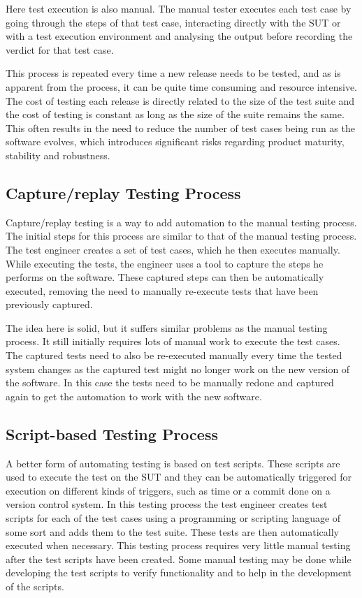 Here test execution is also manual. The manual tester executes each test case by going through the steps of that test case, interacting directly with the SUT or with a test execution environment and analysing the output before recording the verdict for that test case.

This process is repeated every time a new release needs to be tested, and as is apparent from the process, it can be quite time consuming and resource intensive. The cost of testing each release is directly related to the size of the test suite and the cost of testing is constant as long as the size of the suite remains the same. This often results in the need to reduce the number of test cases being run as the software evolves, which introduces significant risks regarding product maturity, stability and robustness.

\subsection{Capture/replay Testing Process}
Capture/replay testing is a way to add automation to the manual testing process. The initial steps for this process are similar to that of the manual testing process. The test engineer creates a set of test cases, which he then executes manually. While executing the tests, the engineer uses a tool to capture the steps he performs on the software. These captured steps can then be automatically executed, removing the need to manually re-execute tests that have been previously captured.

The idea here is solid, but it suffers similar problems as the manual testing process. It still initially requires lots of manual work to execute the test cases. The captured tests need to also be re-executed manually every time the tested system changes as the captured test might no longer work on the new version of the software. In this case the tests need to be manually redone and captured again to get the automation to work with the new software.

\subsection{Script-based Testing Process}
A better form of automating testing is based on test scripts. These scripts are used to execute the test on the SUT and they can be automatically triggered for execution on different kinds of triggers, such as time or a commit done on a version control system. In this testing process the test engineer creates test scripts for each of the test cases using a programming or scripting language of some sort and adds them to the test suite. These tests are then automatically executed when necessary. This testing process requires very little manual testing after the test scripts have been created. Some manual testing may be done while developing the test scripts to verify functionality and to help in the development of the scripts.

